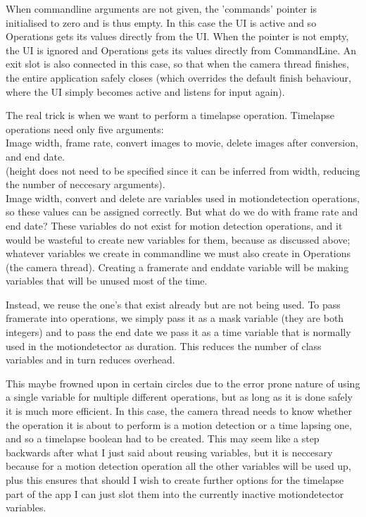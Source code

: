 When commandline arguments are not given, the 'commands' pointer is initialised to zero and is thus empty. In this case the UI is active and so Operations gets its values directly from the UI. When the pointer is not empty, the UI is ignored and Operations gets its values directly from CommandLine. An exit slot is also connected in this case, so that when the camera thread finishes, the entire application safely closes (which overrides the default finish behaviour, where the UI simply becomes active and listens for input again).

The real trick is when we want to perform a timelapse operation. Timelapse operations need only five arguments:
\\ Image width, frame rate, convert images to movie,  delete images after conversion, and end date.\\
(height does not need to be specified since it can be inferred from width, reducing the number of neccesary arguments).\\
Image width, convert and delete are variables used in motiondetection operations, so these values can be assigned correctly. But what do we do with frame rate and end date? These variables do not exist for motion detection operations, and it would be wasteful to create new variables for them, because as discussed above; whatever variables we create in commandline we must also create in Operations (the camera thread). Creating a framerate and enddate variable will be making variables that will be unused most of the time.

Instead, we reuse the one's that exist already but are not being used. To pass framerate into operations, we simply pass it as a mask variable (they are both integers) and to pass the end date we pass it as a time variable that is normally used in the motiondetector as duration. This reduces the number of class variables and in turn reduces overhead.

This maybe frowned upon in certain circles due to the error prone nature of using a single variable for multiple different operations, but as long as it is done safely it is much more efficient. In this case, the camera thread needs to know whether the operation it is about to perform is a motion detection or a time lapsing one, and so a timelapse boolean had to be created. This may seem like a step backwards after what I just said about reusing variables, but it is neccesary because for a motion detection operation all the other variables will be used up, plus this ensures that should I wish to create further options for the timelapse part of the app I can just slot them into the currently inactive motiondetector variables.

